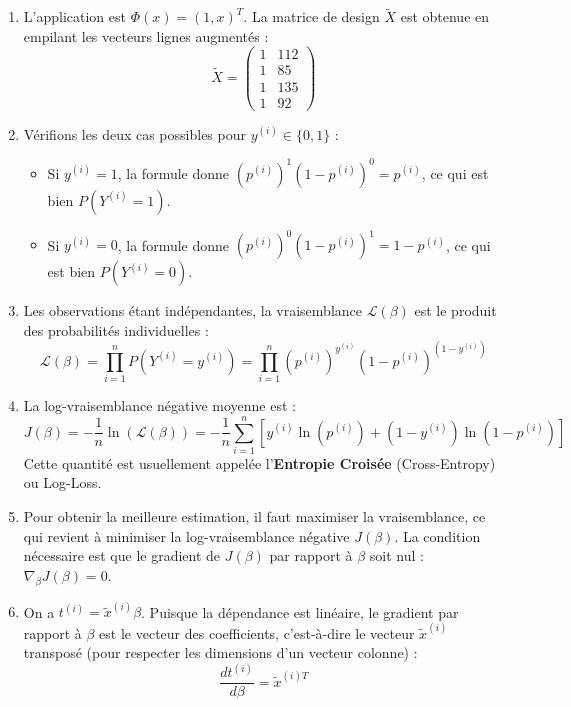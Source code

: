 \documentclass[solutions]{../exercices}
\begin{document}
\begin{solution}
    \begin{enumerate}
        \item L'application est $\Phi(x) = (1, x)^T$. La matrice de design $\tilde{X}$ est obtenue en empilant les vecteurs lignes augmentés :
        \[
            \tilde{X} = \begin{pmatrix}
                1 & 112 \\
                1 & 85 \\
                1 & 135 \\
                1 & 92
            \end{pmatrix}
        \]

        \item Vérifions les deux cas possibles pour $y^{(i)} \in \{0, 1\}$ :
        \begin{itemize}
            \item Si $y^{(i)} = 1$, la formule donne $(p^{(i)})^1 (1-p^{(i)})^0 = p^{(i)}$, ce qui est bien $P(Y^{(i)}=1)$.
            \item Si $y^{(i)} = 0$, la formule donne $(p^{(i)})^0 (1-p^{(i)})^1 = 1-p^{(i)}$, ce qui est bien $P(Y^{(i)}=0)$.
        \end{itemize}

        \item Les observations étant indépendantes, la vraisemblance $\mathcal{L}(\beta)$ est le produit des probabilités individuelles :
        \[
            \mathcal{L}(\beta) = \prod_{i=1}^n P(Y^{(i)} = y^{(i)}) = \prod_{i=1}^n \left( p^{(i)} \right)^{y^{(i)}} \left(1 - p^{(i)}\right)^{\left(1 - y^{(i)}\right)}
        \]

        \item La log-vraisemblance négative moyenne est :
        \[
            J(\beta) = - \frac{1}{n} \ln(\mathcal{L}(\beta)) = - \frac{1}{n} \sum_{i=1}^n \left[ y^{(i)} \ln(p^{(i)}) + (1 - y^{(i)}) \ln(1 - p^{(i)}) \right]
        \]
        Cette quantité est usuellement appelée l'\textbf{Entropie Croisée} (Cross-Entropy) ou Log-Loss.

        \item Pour obtenir la meilleure estimation, il faut maximiser la vraisemblance, ce qui revient à minimiser la log-vraisemblance négative $J(\beta)$. La condition nécessaire est que le gradient de $J(\beta)$ par rapport à $\beta$ soit nul : $\nabla_\beta J(\beta) = 0$.

        \item On a $t^{(i)} = \tilde{x}^{(i)} \beta$. Puisque la dépendance est linéaire, le gradient par rapport à $\beta$ est le vecteur des coefficients, c'est-à-dire le vecteur $\tilde{x}^{(i)}$ transposé (pour respecter les dimensions d'un vecteur colonne) :
        \[ \frac{d t^{(i)}}{d\beta} = \tilde{x}^{(i)T} \]


\end{enumerate}
\end{solution}
\end{document}
